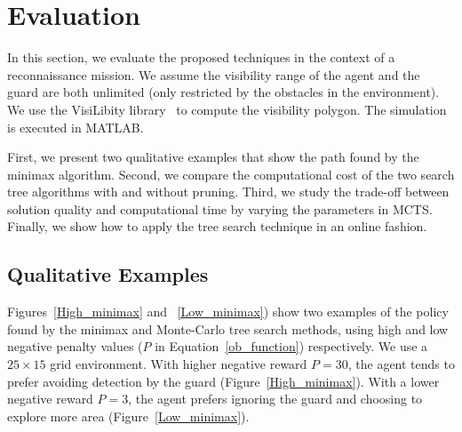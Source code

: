 \documentclass[10 pt, conference]{ieeeconf}
\begin{document}
\section{Evaluation} \label{sec:sim}
In this section, we evaluate the proposed techniques in the context of a reconnaissance mission. We assume the visibility range of the agent and the guard are both unlimited (only restricted by the obstacles in the environment). We use the VisiLibity library~\cite{VisiLibity} to compute the visibility polygon. The simulation is executed in MATLAB.

First, we present two qualitative examples that show the path found by the minimax algorithm. Second, we compare the computational cost of the two search tree algorithms with and without pruning. Third, we study the trade-off between solution quality and computational time by varying the parameters in MCTS. Finally, we show how to apply the tree search technique in an online fashion.

\subsection{Qualitative Examples}

Figures~\ref{High_minimax} and ~\ref{Low_minimax}) show two examples of the policy found by the minimax and Monte-Carlo tree search methods, using high and low negative penalty values ($P$ in Equation~\ref{ob_function}) respectively. 
We use a $25 \times 15$ grid environment. With higher negative reward $P=30$, the agent tends to prefer avoiding detection by the guard (Figure~\ref{High_minimax}). With a lower negative reward $P=3$, the agent prefers ignoring the guard and choosing to explore more area (Figure~\ref{Low_minimax}). 
\end{document}
